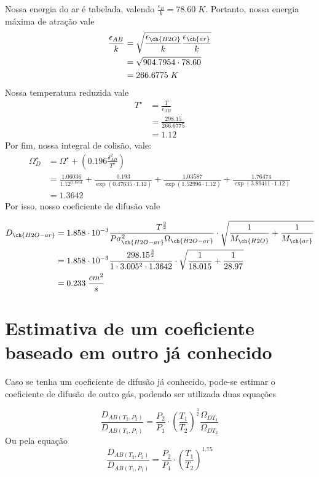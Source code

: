 Nossa energia do ar é tabelada, valendo \(\frac{\epsilon_B }{k} = 78.60 \; K\). Portanto, nossa
energia máxima de atração vale
\begin{align}
    \frac{\epsilon_{AB}}{k} &= \sqrt{\frac{\epsilon_{\ch{H2O}}}{k} \frac{\epsilon_{\ch{ar}}}{k}} \\
    &= \sqrt{904.7954 \cdot 78.60} \\
    &= 266.6775 \; K
\end{align}
Nossa temperatura reduzida vale
\begin{align}
    T^{\star} &= \frac{T}{\epsilon_{AB}} \\
    &= \frac{298.15}{266.6775} \\
    &= 1.12
\end{align}
Por fim, nossa integral de colisão, vale:
\begin{align}
    \Omega_{D}^{\star}  &= \Omega^{\star} + \left( 0.196 \frac{\delta_{AB}^{2} }{T^{\star} } \right) \\
    &= \frac{1.06036}{1.12^{0.1561} } + \frac{0.193}{\exp \left( 0.47635 \cdot 1.12 \right) } + \frac{1.03587}{\exp \left( 1.52996 \cdot 1.12 \right) } + \frac{1.76474}{\exp \left( 3.89411 \cdot 1.12 \right) }\\
    &= 1.3642
\end{align}
Por isso, nosso coeficiente de difusão vale

\begin{align}
    D_{\ch{H2O-ar}} &= 1.858 \cdot 10^{-3} \frac{T^{\frac{3}{2}} }{P \sigma_{\ch{H2O-ar}}^{2} \Omega_{\ch{H2O-ar}}} \cdot \sqrt{\frac{1}{M_{\ch{H2O}}} + \frac{1}{M_{\ch{ar}}}} \\
    &= 1.858 \cdot 10^{-3} \frac{298.15^{\frac{3}{2}} }{1 \cdot 3.005^{2} \cdot 1.3642} \cdot \sqrt{\frac{1}{18.015} + \frac{1}{28.97}} \\
    &= 0.233 \; \frac{cm^2}{s}
\end{align}
\section{Estimativa de um coeficiente baseado em outro já conhecido}

Caso se tenha um coeficiente de difusão já conhecido, pode-se estimar o coeficiente de difusão de
outro gás, podendo ser utilizada duas equações

\begin{equation}\label{eq:estimativa_coeficiente_difusao_1}
\frac{D_{AB(T_{2},P_2)} }{D_{AB(T_{1},P_1)} } = \frac{P_2}{P_1} \cdot \left(\frac{T_1}{T_2}\right)^{\frac{3}{2}}  \frac{\Omega_{DT_{1}} }{\Omega_{DT_{2}} }
\end{equation}
Ou pela equação
\begin{equation}\label{eq:estimativa_coeficiente_difusao_2}
    \frac{D_{AB(T_{2},P_2)} }{D_{AB(T_{1},P_1)} } = \frac{P_2}{P_1} \cdot \left(\frac{T_1}{T_2}\right)^{1.75}
\end{equation}

